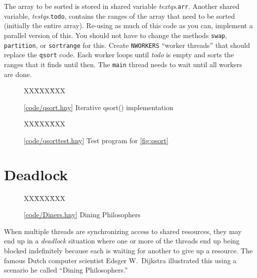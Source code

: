 \documentclass{report}
\newcommand{\harmonysource}[1]{
\begin{tabbing}
XX\=XXX\=XXX\kill
    
\end{tabbing}
}
\newcommand{\harmonylink}[1]{%
[\href{https://harmony.cs.cornell.edu/#1}{\underline{#1}}]%
}
\newenvironment{code}{
\tcolorbox
}{
\endtcolorbox
}
\begin{document}
\begin{problems}
The array to be sorted is stored in shared variable \textit{textqs}.\texttt{arr}.
Another shared variable, \textit{testqs}.\texttt{todo}, contains the ranges of the
array that need to be sorted (initially the entire array).
Re-using as much of this code as you can, implement a parallel version of
this.  You should not have to change the methods \texttt{swap}, \texttt{partition},
or \texttt{sortrange} for this.  Create \texttt{NWORKERS} ``worker threads''
that should replace the \texttt{qsort} code.
Each worker loops until \textit{todo}
is empty and sorts the ranges that it finds until then.  The \texttt{main}
thread needs to wait until all workers are done.
\end{problems}

\begin{figure}
\begin{code}
\harmonysource{qsort}
\end{code}
\caption{\harmonylink{code/qsort.hny} Iterative qsort() implementation}
\label{fig:qsort}
\end{figure}

\begin{figure}
\begin{code}
\harmonysource{qsorttest}
\end{code}
\caption{\harmonylink{code/qsorttest.hny} Test program for \autoref{fig:qsort}}
\label{fig:qsorttest}
\end{figure}

\chapter{Deadlock}
\label{ch:deadlock}
%

%

\begin{figure}
\begin{code}
\harmonysource{Diners}
\end{code}
\caption{\harmonylink{code/Diners.hny} Dining Philosophers}
\label{fig:diners}
\end{figure}

When multiple threads are synchronizing access to shared resources, they
may end up in a \emph{deadlock} situation where one or more of the threads
end up being blocked indefinitely because each is waiting for another to give
up a resource.
The famous Dutch computer scientist Edsger W.~Dijkstra illustrated this using
a scenario he called ``Dining Philosophers.''
%
\end{document}
